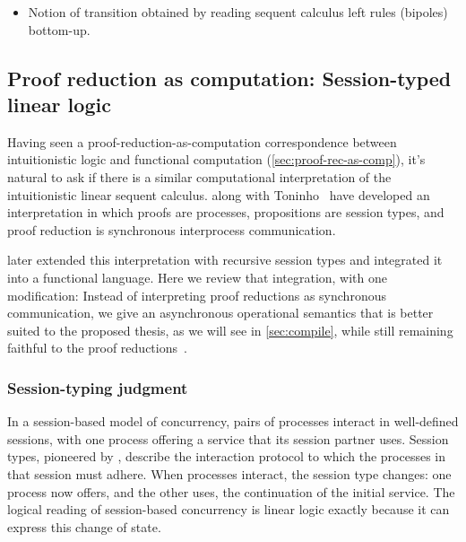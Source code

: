 \begin{itemize}
\item Notion of transition obtained by reading sequent calculus left rules  (bipoles) bottom-up.
\end{itemize}

\subsection{Proof reduction as computation: Session-typed linear logic}\label{sec:async-sill}

Having seen a proof-reduction-as-computation correspondence between intuitionistic logic and functional computation (\cref{sec:proof-rec-as-comp}), it's natural to ask if there is a similar computational interpretation of the intuitionistic linear sequent calculus.
\Textcite{Caires+Pfenning:CONCUR10} along with Toninho~\autocite*{Caires+:TLDI12} have developed
an interpretation
in which proofs are processes, propositions are session types, and proof reduction is synchronous interprocess communication.

\Textcite{Toninho+:ESOP13} later extended this interpretation with recursive session types and integrated it into a functional language.
Here we review that integration, with one modification:
Instead of interpreting proof reductions as synchronous communication, we give an asynchronous operational semantics that is better suited to the proposed thesis, as we will see in \cref{sec:compile}, while still remaining faithful to the proof reductions~\autocite{DeYoung+:CSL12}.

\subsubsection{Session-typing judgment}\label{sec:sess-typing-judgm}

In a session-based model of concurrency, pairs of processes interact in well-defined sessions, with one process offering a service that its session partner uses.
Session types, pioneered by \textcite{Honda:CONCUR93}, describe the interaction protocol to which the processes in that session must adhere.
When processes interact, the session type changes: one process now offers, and the other uses, the continuation of the initial service.
The logical reading of session-based concurrency is linear logic exactly because it can express this change of state.

